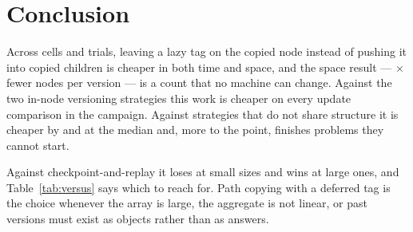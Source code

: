 \documentclass[11pt,a4paper]{article}
\begin{document}
\section{Conclusion}

Across  cells and  trials, leaving a lazy tag on
the copied node instead of pushing it into copied children is cheaper in both time
and space, and the space result --- $\times$ fewer nodes per
version --- is a count that no machine can change. Against the two in-node
versioning strategies this work is cheaper on every update comparison in the
campaign. Against strategies that do not share structure it is cheaper by
 and  at the median and, more
to the point, finishes problems they cannot start.

Against checkpoint-and-replay it loses at small sizes and wins at large ones, and
Table~\ref{tab:versus} says which to reach for. Path copying with a deferred tag is
the choice whenever the array is large, the aggregate is not linear, or past
versions must exist as objects rather than as answers.
\end{document}
